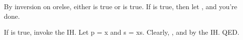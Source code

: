 \documentclass[11pt,letterpaper]{article}
\begin{document}

By inversion on orelse, either  is true or  is true.
If  is true, then let , and you're done.

If  is true, invoke the IH.
Let p = x and s = xs. Clearly, , and  by the IH. QED.
\end{document}
